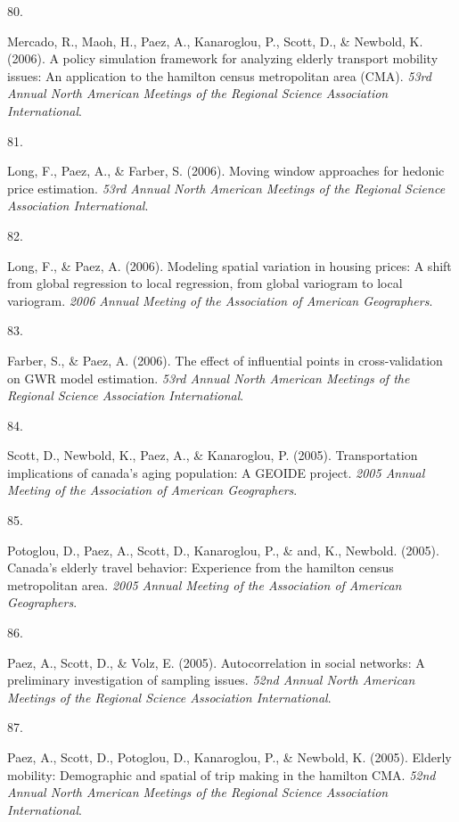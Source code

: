 \documentclass[10pt,a4paper,]{twentysecondcv}
\newlength{\csllabelwidth}
\newcommand{\CSLLeftMargin}[1]{\parbox[t]{\csllabelwidth}{#1}}
\newcommand{\CSLRightInline}[1]{\parbox[t]{\linewidth - \csllabelwidth}{#1}}
\begin{document}
\leavevmode{}%
\CSLLeftMargin{80. }%
\CSLRightInline{Mercado, R., Maoh, H., Paez, A., Kanaroglou, P., Scott,
D., \& Newbold, K. (2006). A policy simulation framework for analyzing
elderly transport mobility issues: An application to the hamilton census
metropolitan area (CMA). \emph{53rd Annual North American Meetings of
the Regional Science Association International}.}

\leavevmode{}%
\CSLLeftMargin{81. }%
\CSLRightInline{Long, F., Paez, A., \& Farber, S. (2006). Moving window
approaches for hedonic price estimation. \emph{53rd Annual North
American Meetings of the Regional Science Association International}.}

\leavevmode{}%
\CSLLeftMargin{82. }%
\CSLRightInline{Long, F., \& Paez, A. (2006). Modeling spatial variation
in housing prices: A shift from global regression to local regression,
from global variogram to local variogram. \emph{2006 Annual Meeting of
the Association of American Geographers}.}

\leavevmode{}%
\CSLLeftMargin{83. }%
\CSLRightInline{Farber, S., \& Paez, A. (2006). The effect of
influential points in cross-validation on GWR model estimation.
\emph{53rd Annual North American Meetings of the Regional Science
Association International}.}

\leavevmode{}%
\CSLLeftMargin{84. }%
\CSLRightInline{Scott, D., Newbold, K., Paez, A., \& Kanaroglou, P.
(2005). Transportation implications of canada's aging population: A
GEOIDE project. \emph{2005 Annual Meeting of the Association of American
Geographers}.}

\leavevmode{}%
\CSLLeftMargin{85. }%
\CSLRightInline{Potoglou, D., Paez, A., Scott, D., Kanaroglou, P., \&
and, K., Newbold. (2005). Canada's elderly travel behavior: Experience
from the hamilton census metropolitan area. \emph{2005 Annual Meeting of
the Association of American Geographers}.}

\leavevmode{}%
\CSLLeftMargin{86. }%
\CSLRightInline{Paez, A., Scott, D., \& Volz, E. (2005). Autocorrelation
in social networks: A preliminary investigation of sampling issues.
\emph{52nd Annual North American Meetings of the Regional Science
Association International}.}

\leavevmode{}%
\CSLLeftMargin{87. }%
\CSLRightInline{Paez, A., Scott, D., Potoglou, D., Kanaroglou, P., \&
Newbold, K. (2005). Elderly mobility: Demographic and spatial of trip
making in the hamilton CMA. \emph{52nd Annual North American Meetings of
the Regional Science Association International}.}
\end{document}
